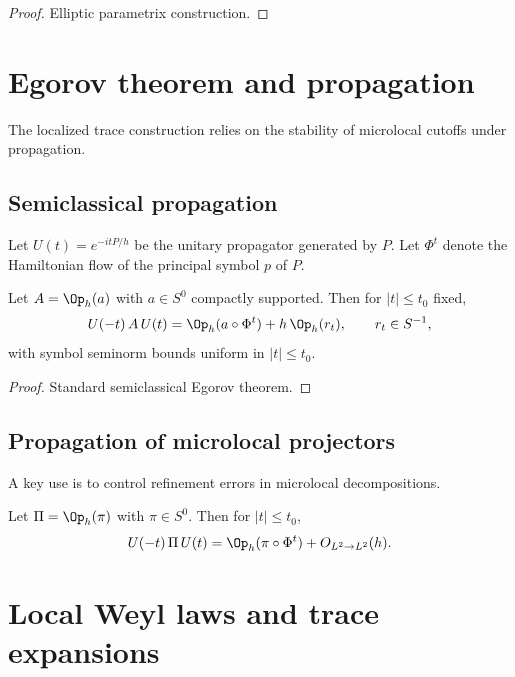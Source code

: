 \begin{proof}
Elliptic parametrix construction.
\end{proof}

\section{Egorov theorem and propagation}
\label{sec:C.egorov}

The localized trace construction relies on the stability of microlocal cutoffs under propagation.

\subsection{Semiclassical propagation}
\label{subsec:C.propagation}

Let $U(t)=e^{-itP/h}$ be the unitary propagator generated by $P$.
Let $\Phi^t$ denote the Hamiltonian flow of the principal symbol $p$ of $P$.

\begin{theorem}
\label{thm:C.egorov}
Let $A=\Op_h(a)$ with $a\in S^0$ compactly supported.
Then for $|t|\le t_0$ fixed,
\[
U(-t)\,A\,U(t)
=
\Op_h(a\circ\Phi^t) + h\,\Op_h(r_t),
\qquad
r_t\in S^{-1},
\]
with symbol seminorm bounds uniform in $|t|\le t_0$.
\end{theorem}

\begin{proof}
Standard semiclassical Egorov theorem.
\end{proof}

\subsection{Propagation of microlocal projectors}
\label{subsec:C.projector-propagation}

A key use is to control refinement errors in microlocal decompositions.

\begin{corollary}
\label{cor:C.propagation-cutoff}
Let $\Pi=\Op_h(\pi)$ with $\pi\in S^0$.
Then for $|t|\le t_0$,
\[
U(-t)\,\Pi\,U(t)
=
\Op_h(\pi\circ\Phi^t) + O_{L^2\to L^2}(h).
\]
\end{corollary}

\section{Local Weyl laws and trace expansions}
\label{sec:C.local-weyl}


